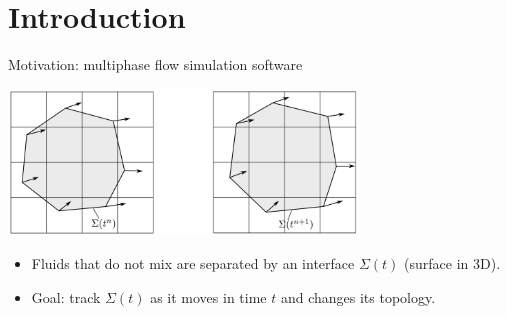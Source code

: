 \section{Introduction}

\begin{frame}{Motivation: multiphase flow simulation software}

    \begin{center}
    \includegraphics[width=0.7\textwidth]{figures/interface.png}
    \end{center}
    \begin{itemize}
        \item Fluids that do not mix are separated by an interface $\Sigma(t)$ (surface in 3D). 
        \item Goal: track $\Sigma(t)$ as it moves in time $t$ and changes its topology. 
    \end{itemize}

\end{frame}

